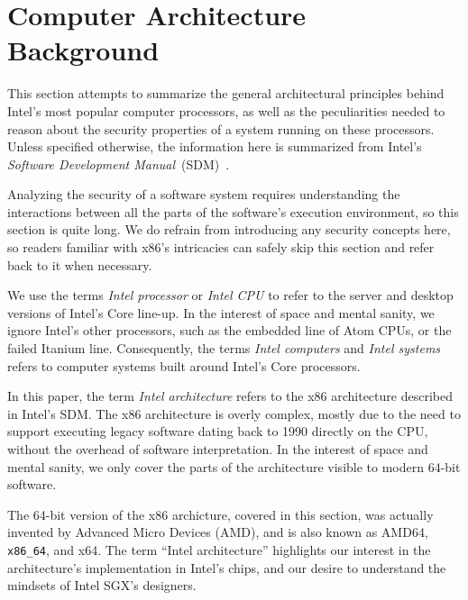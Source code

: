 \section{Computer Architecture Background}
\label{sec:architecture_background}

This section attempts to summarize the general architectural principles behind
Intel's most popular computer processors, as well as the peculiarities needed
to reason about the security properties of a system running on these
processors. Unless specified otherwise, the information here is summarized from
Intel's \textit{Software Development Manual}~(SDM)~\cite{intel2015sdm}.

Analyzing the security of a software system requires understanding the
interactions between all the parts of the software's execution environment, so
this section is quite long. We do refrain from introducing any security
concepts here, so readers familiar with x86's intricacies can safely skip this
section and refer back to it when necessary.

We use the terms \textit{Intel processor} or \textit{Intel CPU} to refer to the
server and desktop versions of Intel's Core line-up. In the interest of space
and mental sanity, we ignore Intel's other processors, such as the embedded
line of Atom CPUs, or the failed Itanium line. Consequently, the terms
\textit{Intel computers} and \textit{Intel systems} refers to computer systems
built around Intel's Core processors.

In this paper, the term \textit{Intel architecture} refers to the x86
architecture described in Intel's SDM. The x86 architecture is overly complex,
mostly due to the need to support executing legacy software dating back to 1990
directly on the CPU, without the overhead of software interpretation. In the
interest of space and mental sanity, we only cover the parts of the
architecture visible to modern 64-bit software.

The 64-bit version of the x86 archicture, covered in this section, was actually
invented by Advanced Micro Devices (AMD), and is also known as AMD64,
\texttt{x86\_64}, and x64. The term ``Intel architecture'' highlights our
interest in the architecture's implementation in Intel's chips, and our desire
to understand the mindsets of Intel SGX's designers.



















